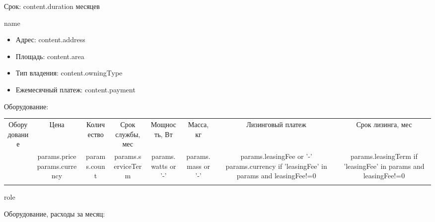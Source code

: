 \documentclass[a4paper,12pt]{article}
\begin{document}
{{{{{{{{{{{{      Срок: {{ content.duration }} месяцев
  {%
{%

{%
  {%
    {{ name }}

    \begin{itemize}
    \item Адрес: {{ content.address }}
    \item Площадь: {{ content.area }}
    \item Тип владения: {{ content.owningType }}
    \item Ежемесячный платеж: {{ content.payment }}
    \end{itemize}
    {%
    Оборудование:
    \begin{center}
      \begin{tabular}{ |c|c|c|c|c|c|c|c| }
         \hline
         Оборудование & Цена & Количество & Срок службы, мес & Мощность, Вт & Масса, кг & Лизинговый платеж & Срок лизинга, мес\\
      {%
         \hline
         {{ equipmentName }} &
         {{ params.price }} {{ params.currency }} &
         {{ params.count }} &
         {{ params.serviceTerm }} &
         {{ params.watts or '-' }} &
         {{ params.mass or '-' }} &
         {{ params.leasingFee or '-' }}{{ params.currency if 'leasingFee' in params and leasingFee!=0 }} &
         {{ params.leasingTerm if 'leasingFee' in params and leasingFee!=0 }}\\
      {%
         \hline
      \end{tabular}
    \end{center}
    {%
    {%
      {%
      {{ role }}
        {%
        {%
      {%
    {%

    {%
    Оборудование, расходы за месяц:
    {%
    {%
      {%
      {%
        {%
      {%
        {%
      {%
    {%
    {%
  {%
{%

}}}}}}}}}}}}}}}}}}}}}}}}}}}}}}}}}}}}}
\end{document}
